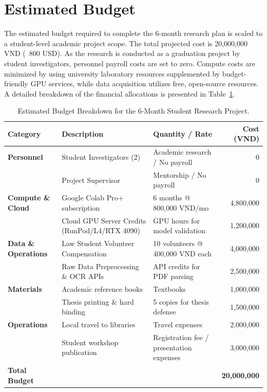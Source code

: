 \section{Estimated Budget}

The estimated budget required to complete the 6-month research plan is scaled to a student-level academic project scope. The total projected cost is 20,000,000 VND (~$800$ USD). As the research is conducted as a graduation project by student investigators, personnel payroll costs are set to zero. Compute costs are minimized by using university laboratory resources supplemented by budget-friendly GPU services, while data acquisition utilizes free, open-source resources. A detailed breakdown of the financial allocations is presented in Table~\ref{tab:estimated_budget}.

\begin{table}[p]
\small
\centering
\caption{Estimated Budget Breakdown for the 6-Month Student Research Project.}
\label{tab:estimated_budget}
\begin{tabularx}{\textwidth}{lXXr}
\hline
\textbf{Category} & \textbf{Description} & \textbf{Quantity / Rate} & \textbf{Cost (VND)} \\
\hline
\textbf{Personnel} & Student Investigators (2) & Academic research / No payroll & 0 \\
                   & Project Supervisor & Mentorship / No payroll & 0 \\
\hline
\textbf{Compute \& Cloud} & Google Colab Pro+ subscription & 6 months @ 800,000 VND/mo & 4,800,000 \\
                          & Cloud GPU Server Credits (RunPod/L4/RTX 4090) & GPU hours for model validation & 1,200,000 \\
\hline
\textbf{Data \& Operations} & Law Student Volunteer Compensation & 10 volunteers @ 400,000 VND each & 4,000,000 \\
                            & Raw Data Preprocessing \& OCR APIs & API credits for PDF parsing & 2,500,000 \\
\hline
\textbf{Materials} & Academic reference books & Textbooks & 1,000,000 \\
                   & Thesis printing \& hard binding & 5 copies for thesis defense & 1,500,000 \\
\hline
\textbf{Operations} & Local travel to libraries & Travel expenses & 2,000,000 \\
                    & Student workshop publication & Registration fee / presentation expenses & 3,000,000 \\
\hline
\textbf{Total Budget} & & & \textbf{20,000,000} \\
\hline
\end{tabularx}
\end{table}

